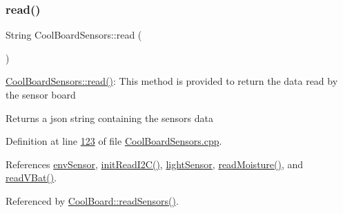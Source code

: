 \subsubsection{\texorpdfstring{read()}{read()}}
{\footnotesize\ttfamily String Cool\+Board\+Sensors\+::read (\begin{DoxyParamCaption}{ }\end{DoxyParamCaption})}

\hyperlink{class_cool_board_sensors_a91badb2539d91fda8679f2a597874c48}{Cool\+Board\+Sensors\+::read()}\+: This method is provided to return the data read by the sensor board

\begin{DoxyReturn}{Returns}
a json string containing the sensors data 
\end{DoxyReturn}


Definition at line \hyperlink{_cool_board_sensors_8cpp_source_l00123}{123} of file \hyperlink{_cool_board_sensors_8cpp_source}{Cool\+Board\+Sensors.\+cpp}.



References \hyperlink{_cool_board_sensors_8h_source_l00077}{env\+Sensor}, \hyperlink{_cool_board_sensors_8cpp_source_l00193}{init\+Read\+I2\+C()}, \hyperlink{_cool_board_sensors_8h_source_l00075}{light\+Sensor}, \hyperlink{_cool_board_sensors_8cpp_source_l00444}{read\+Moisture()}, and \hyperlink{_cool_board_sensors_8cpp_source_l00423}{read\+V\+Bat()}.



Referenced by \hyperlink{_cool_board_8cpp_source_l00509}{Cool\+Board\+::read\+Sensors()}.


